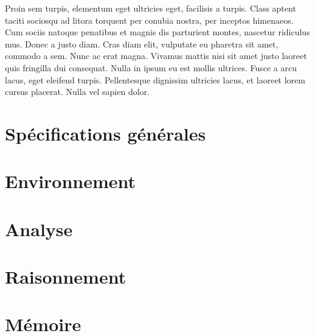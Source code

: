 Proin sem turpis, elementum eget ultricies eget, facilisis a turpis. Class aptent taciti sociosqu ad litora torquent per conubia nostra, per inceptos himenaeos. Cum sociis natoque penatibus et magnis dis parturient montes, nascetur ridiculus mus. Donec a justo diam. Cras diam elit, vulputate eu pharetra sit amet, commodo a sem. Nunc ac erat magna. Vivamus mattis nisi sit amet justo laoreet quis fringilla dui consequat. Nulla in ipsum eu est mollis ultrices. Fusce a arcu lacus, eget eleifend turpis. Pellentesque dignissim ultricies lacus, et laoreet lorem cursus placerat. Nulla vel sapien dolor. 

\section{Spécifications générales}



\section{Environnement}



\section{Analyse}



\section{Raisonnement}



\section{Mémoire}

